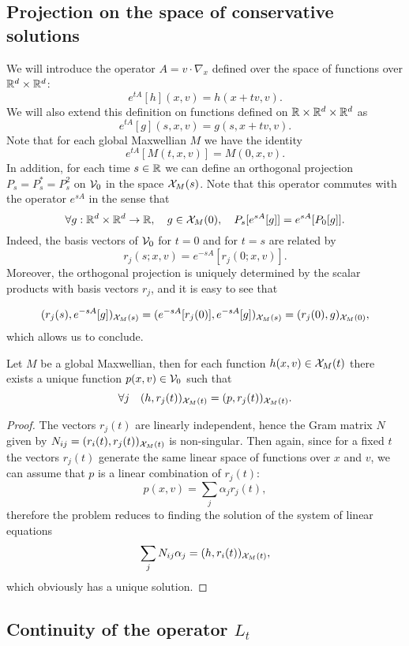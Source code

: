 \subsection{Projection on the space of conservative solutions} %
\label{sub:projector_on_the_space_of_conservative_solutions}
We will introduce the operator $A=v\cdot\nabla_x $
defined over the space of functions over ${{\mathbb R^d}\times{\mathbb R^d}}$:
\[e^{tA}[h](x,v)=h(x+tv,v).\]
We will also extend this definition on functions defined on ${\mathbb R}\times{{\mathbb R^d}\times{\mathbb R^d}} $ as
\[e^{tA}[g](s,x,v)=g(s,x+tv,v).\] Note that for each global Maxwellian $M$ we have the identity
\[e^{ tA}[M(t,x,v) ]=M(0,x,v).\]
In addition, for each time $s\in{\mathbb R}$ we can define an orthogonal projection $P_s=P_s^*=P_s^2$ on ${\mathcal V_0}$ in the space ${\mathcal X_M(s)}$.
Note that this operator commutes with the operator $e^{sA}$ in the sense that
\[
	\forall g:{\mathbb R^d}\times{\mathbb R^d}\to{\mathbb R},\quad g\in {\mathcal X_M(0)},\quad P_s[e^{sA}[g]]=e^{sA}[P_0[g]].	
\]
Indeed, the basis vectors of ${\mathcal V_0}$ for $t=0$ and for $t=s$ are related by
\[r_j(s;x,v)=e^{-sA}[r_j(0;x,v)].\] Moreover, the orthogonal projection is uniquely determined by the scalar products with basis vectors $r_j$, and it is easy to see that

\[(r_j(s),e^{-sA}[g])_{{\mathcal X_M(s)}} = (e^{-sA}[r_j(0)],e^{-sA}[g])_{{\mathcal X_M(s)}}=(r_j(0),g)_{{\mathcal X_M(0)}}, \]
which allows us to conclude.

\begin{lemma}
	\label{le:CS-invert}
	Let $M$ be a global Maxwellian, then for each function $h(x,v)\in {\mathcal X_M(t)}$ there exists a unique function $p(x,v)\in {\mathcal V_0}$ such that
	\[\forall j\quad (h,r_j(t))_{{\mathcal X_M(t)}}=(p,r_j(t))_{{\mathcal X_M(t)}}.\]
\end{lemma}
\begin{proof}
	The vectors $r_j(t)$ are linearly independent, hence the Gram matrix $N$ given by $N_{ij}=(r_i(t),r_j(t))_{{\mathcal X_M(t)}}$ is non-singular. Then again, since for a fixed $t$ the vectors $r_j(t)$ generate the same linear space of functions over $x$ and $v$, we can assume that $p$ is a linear combination of $r_j(t)$:
	\[p(x,v)=\sum_j \alpha_jr_j(t),\] therefore the problem reduces to finding the solution of the system of linear equations \[ \sum_jN_{ij}\alpha_j=(h,r_i(t))_{{\mathcal X_M(t)}},\]
	which obviously has a unique solution.
\end{proof}





\subsection{Continuity of the operator $L_t$} %
\label{sub:continuity_of_the_operator_Lt}

